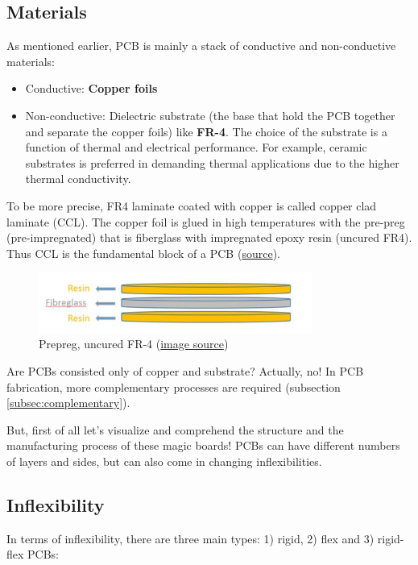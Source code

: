 \documentclass[final]{cubedoc}
\begin{document}
	\subsection{Materials}
	
	As mentioned earlier, PCB is mainly a stack of conductive and non-conductive materials:
	
	\begin{itemize}
		\item Conductive: \textbf{Copper foils}
		\item Non-conductive: Dielectric substrate (the base that hold the PCB together and separate the copper foils) like \textbf{FR-4}. The choice of the substrate is a function of thermal and electrical performance. For example, ceramic substrates is preferred in demanding thermal applications due to the higher thermal conductivity.
	\end{itemize}
	
	To be more precise, FR4 laminate coated with copper is called copper clad laminate (CCL). The copper foil is glued in high temperatures with the pre-preg (pre-impregnated) that is fiberglass with impregnated epoxy resin (uncured FR4). Thus CCL is the fundamental block of a PCB (\href{https://www.pcbway.com/blog/PCB_Basic_Information/Copper_Clad_Laminate.html}{source}).
	
	\begin{figure}[h]
		\centering
		\includegraphics[width=0.8\textwidth,height=0.8\textheight,keepaspectratio]{assets/fiberglass_resin.png}
		\caption{Prepreg, uncured FR-4 \small({\href{https://www.pcbway.com/blog/PCB_Basic_Information/Copper_Clad_Laminate.html}{image source}})}
	\end{figure}
	
	Are PCBs consisted only of copper and substrate? Actually, no! In PCB fabrication, more complementary processes are required (subsection \ref{subsec:complementary}).
	
	But, first of all let’s visualize and comprehend the structure and the manufacturing process of these magic boards! PCBs can have different numbers of layers and sides, but can also come in changing inflexibilities. 
	
	\subsection{Inflexibility}
	In terms of inflexibility, there are three main types: 1) rigid, 2) flex and 3) rigid-flex PCBs:
	
\end{document}
